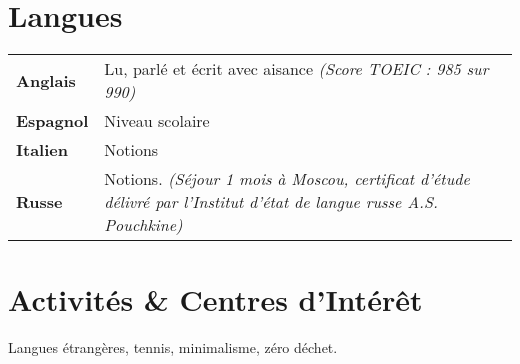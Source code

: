 \documentclass[10pt, a4paper]{article}
\begin{document}
\section{Langues}
\begin{tabu} to 
	\textbf{Anglais} & Lu, parlé et écrit avec aisance \em (Score TOEIC : 985 sur 990)\\
	\textbf{Espagnol} & Niveau scolaire\\
	\textbf{Italien} & Notions\\
	\textbf{Russe} & Notions. \em (Séjour 1 mois à Moscou, certificat d'étude délivré par l'Institut d'état de langue russe A.S. Pouchkine)
\end{tabu}


\section{Activités \& Centres d'Intérêt}
Langues étrangères, tennis, minimalisme, zéro déchet.
\end{document}
